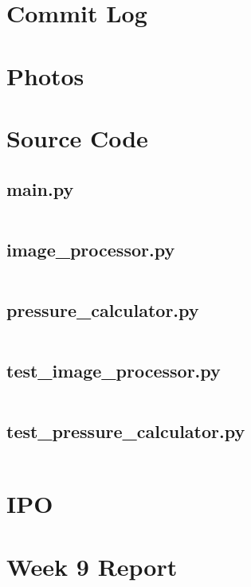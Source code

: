 \section{Commit Log}\label{app:commit_log}
\section{Photos}
\section{Source Code}
	\subsection{main.py}
		\inputminted[breaklines,
					linenos,
					frame=lines,
					fontsize=\footnotesize]{python}{../code/final_program/main.py}
	\subsection{image\_processor.py}
		\inputminted[breaklines,
					linenos,
					frame=lines,
					fontsize=\footnotesize]{python}{../code/final_program/image_processor.py}
	\subsection{pressure\_calculator.py}
		\inputminted[breaklines,
					linenos,
					frame=lines,
					fontsize=\footnotesize]{python}{../code/final_program/pressure_calculator.py}
	\subsection{test\_image\_processor.py}
		\inputminted[breaklines,
					linenos,
					frame=lines,
					fontsize=\footnotesize]{python}{../code/final_program/test_image_processor.py}
	\subsection{test\_pressure\_calculator.py}
		\inputminted[breaklines,
					linenos,
					frame=lines,
					fontsize=\footnotesize]{python}{../code/final_program/test_pressure_calculator.py}
\section{IPO}
\section{Week 9 Report}